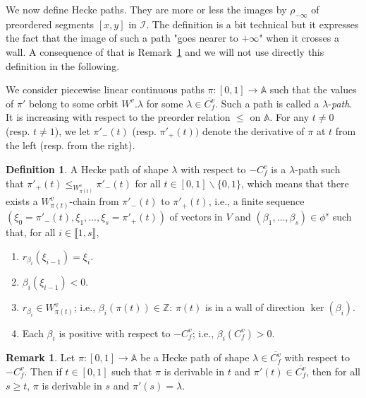 \documentclass[12pt]{article}
\theoremstyle{plain}
\theoremstyle{definition}
\newtheorem{defn}[thm]{Definition}
\newtheorem{rque}[thm]{Remark}
\newcommand{\A}{\mathbb{A}}
\newcommand{\Z}{\mathbb{Z}}
\newcommand{\I}{\mathcal{I}}
\begin{document}
We now define Hecke paths. They are more or less the images by $\rho_{-\infty}$ of preordered segments $[x,y]$ in $\I$. The definition is a bit technical but it expresses the fact that the image of such a path "goes nearer to $+\infty$" when it crosses a wall. A consequence of that is Remark~\ref{rque chemins de Hecke} and we will not use directly this definition in the following.

 We consider piecewise linear continuous paths $\pi:[0,1]\rightarrow \A$ such that the values  of $\pi'$ belong to some orbit $W^v.\lambda$ for some $\lambda\in \overline{C_f^v}$. Such a path is called a $\lambda$-\textit{path}. It is increasing with respect to the preorder relation $\leq$ on $\A$. For any $t\neq 0$ (resp. $t\neq 1$), we let $\pi'_-(t)$ (resp. $\pi'_+(t))$ denote the derivative of $\pi$ at $t$ from the left (resp. from the right).

\begin{defn}
A Hecke path of shape $\lambda$ with respect to $-C_f^v$ is a $\lambda$-path such that
 $\pi'_+(t)\leq_{W^v_{\pi (t)}} \pi'_-(t)$ for all $t\in [0,1]\backslash \{0,1\}$, which 
 means that there exists a $W_{\pi(t)}^v$-chain from $\pi'_-(t)$ to $\pi'_{+}(t)$, i.e., a 
 finite sequence $(\xi_0=\pi'_-(t),\xi_1,\ldots, \xi_s=\pi'_+(t))$ of vectors in $V$ and
  $(\beta_1,\ldots,\beta_s)\in \phi^s$ such that, for all $i\in \llbracket 1,s\rrbracket$,
\begin{enumerate}
\item $r_{\beta_i}(\xi_{i-1})=\xi_i.$

\item $\beta_i(\xi_{i-1})<0.$

\item $r_{\beta_i}\in W^v_{\pi(t)}$; i.e., $\beta_i(\pi(t))\in \Z$: $\pi(t)$ is in a wall of direction $\ker(\beta_i)$.

\item Each $\beta_i$ is positive with respect to $-C_f^v$; i.e., $\beta_i(C_f^v)>0$.
\end{enumerate}
\end{defn}

\begin{rque}\label{rque chemins de Hecke}
Let $\pi:[0,1]\rightarrow \A$ be a Hecke path of shape $\lambda\in \overline{C_f^v}$ with respect to $-C^v_f$. Then if $t\in [0,1]$ such that $\pi$ is derivable in $t$ and $\pi'(t)\in \overline{C_f^v}$, then for all $s\geq t$, $\pi$ is derivable in $s$ and $\pi'(s)=\lambda$.
\end{rque}
\end{document}
